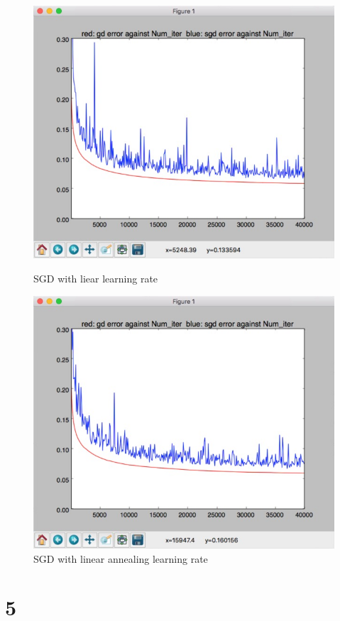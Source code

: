 \documentclass[11pt]{article}
\begin{document}
\begin{figure}[H]
\begin{center}
\includegraphics[scale=0.5]{reg0constant}
\caption{SGD with liear learning rate}
\includegraphics[scale=0.5]{reg0linear}
\caption{SGD with linear annealing learning rate}
\end{center}
\end{figure}
\section*{5}



\end{document}
